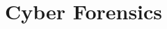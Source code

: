 \documentclass[../main.tex]{subfiles}
\begin{document}
\chapter{Cyber Forensics}
\label{ch:cyber-forensics}

\end{document}
